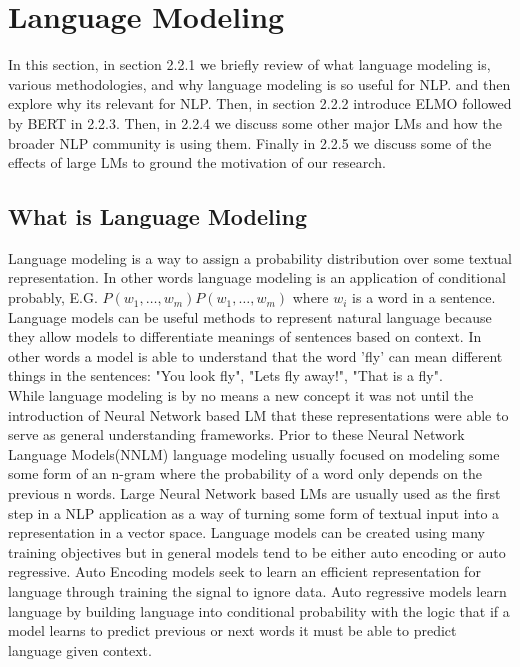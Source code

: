 \section{Language Modeling}
In this section, in section 2.2.1 we briefly review of what language modeling is, various methodologies, and why language modeling is so useful for NLP. and then explore why its relevant for NLP.  Then, in section 2.2.2 introduce ELMO followed by BERT in 2.2.3. Then, in 2.2.4 we discuss some other major LMs and how the broader NLP community is using them. Finally in 2.2.5 we discuss some of the effects of large LMs to ground the motivation of our research.
\subsection{What is Language Modeling}
Language modeling is a way to assign a probability distribution over some textual representation. In other words language modeling is an application of conditional probably, E.G. $P(w_{1},\ldots ,w_{m})P(w_{1},\ldots ,w_{m}) $ where $w_i$ is a word in a sentence. Language models can be useful methods to represent natural language because they allow models to differentiate meanings of sentences based on context. In other words a model is able to understand that the word 'fly' can mean different things in the sentences: "You look fly", "Lets fly away!", "That is a fly". \\
While language modeling is by no means a new concept it was not until the introduction of Neural Network based LM that these representations were able to serve as general understanding frameworks. Prior to these Neural Network Language Models(NNLM) language modeling usually focused on modeling some some form of an n-gram where the probability of a word only depends on the previous n words. Large Neural Network based LMs are usually used as the first step in a NLP application as a way of turning some form of textual input into a representation in a vector space.
Language models can be created using many training objectives but in general models tend to be either auto encoding or auto regressive. Auto Encoding models seek to learn an efficient representation for language through training the signal to ignore data. Auto regressive models learn language by building language into conditional probability with the logic that if a model learns to predict previous or next words it must be able to predict language given context.
